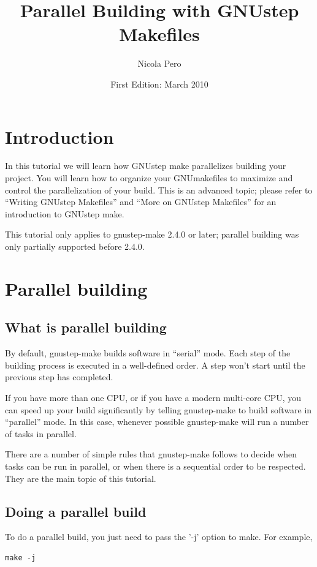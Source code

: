 \documentclass[a4paper]{article}
\begin{document}
\author{Nicola Pero}
\title{Parallel Building with GNUstep Makefiles}
\date{First Edition: March 2010}
\maketitle

\section{Introduction}
In this tutorial we will learn how GNUstep make parallelizes building
your project.  You will learn how to organize your GNUmakefiles to
maximize and control the parallelization of your build.  This is an
advanced topic; please refer to ``Writing GNUstep Makefiles'' and
``More on GNUstep Makefiles'' for an introduction to GNUstep make.

This tutorial only applies to gnustep-make 2.4.0 or later; parallel
building was only partially supported before 2.4.0.

\section{Parallel building}

\subsection{What is parallel building}
By default, gnustep-make builds software in ``serial'' mode.  Each
step of the building process is executed in a well-defined order.  A
step won't start until the previous step has completed.

If you have more than one CPU, or if you have a modern multi-core CPU,
you can speed up your build significantly by telling gnustep-make to
build software in ``parallel'' mode.  In this case, whenever possible
gnustep-make will run a number of tasks in parallel.

There are a number of simple rules that gnustep-make follows to decide
when tasks can be run in parallel, or when there is a sequential order
to be respected.  They are the main topic of this tutorial.

\subsection{Doing a parallel build}
To do a parallel build, you just need to pass the '-j' option to make.
For example,

\begin{verbatim}
make -j
\end{verbatim}
\end{document}
